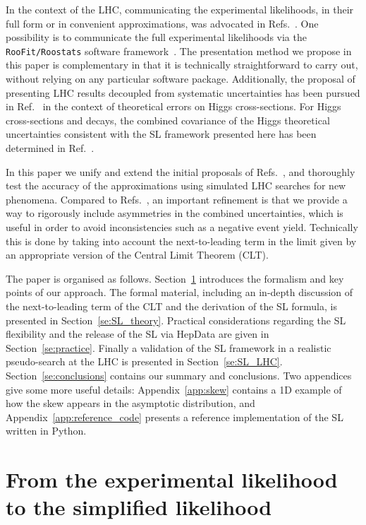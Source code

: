 \documentclass[11pt]{article}
\begin{document}
In the context of the LHC, communicating the experimental likelihoods, in their full form or in convenient approximations, was advocated in Refs.~\cite{Kraml:2012sg,Boudjema:2013qla}. 
One possibility is to communicate the full experimental likelihoods via the \texttt{RooFit/Roostats} software framework~\cite{Verkerke:2003ir,Moneta:2010pm}.  
The presentation method we propose in this paper is complementary in that it is technically straightforward to carry out, without relying on any
particular software package. Additionally, the proposal of presenting LHC results decoupled from systematic uncertainties has been pursued in Ref.~\cite{Cranmer:2013hia} in the context of theoretical errors on Higgs cross-sections. For Higgs cross-sections and decays, the combined covariance of the Higgs theoretical uncertainties consistent with the SL framework presented here has been determined in Ref.~\cite{Arbey:2016kqi}.

In this paper we unify and extend the initial proposals of Refs.~\cite{Fichet:2016gvx,SL_note}, and thoroughly test the accuracy of the approximations using simulated LHC searches for new phenomena.
Compared to Refs.~\cite{Fichet:2016gvx,SL_note}, an important  refinement is that we provide a way 
to rigorously include asymmetries in the combined uncertainties, which is useful in order to avoid inconsistencies such as a negative event yield. Technically this is done by taking into account the next-to-leading term in the limit given by an appropriate version of the Central Limit Theorem (CLT).

The paper is organised as follows. 
Section~\ref{se:EL_SL} introduces the formalism and key points of our approach.  
The formal material, including an in-depth discussion of the next-to-leading term of the CLT and the derivation of the SL formula, is presented in Section~\ref{se:SL_theory}. 
Practical considerations regarding the SL flexibility and the release of the SL via HepData are given in 
Section~\ref{se:practice}.
Finally a validation of the SL framework in a realistic pseudo-search at the LHC is presented in Section~\ref{se:SL_LHC}. 
Section~\ref{se:conclusions} contains our summary and conclusions.
Two appendices give some more useful details: 
Appendix~\ref{app:skew} contains a 1D example of how the skew appears in the asymptotic distribution, and 
Appendix~\ref{app:reference_code} presents a reference implementation of the SL written in Python. 


\clearpage
\section{From the experimental likelihood to the simplified likelihood}
\label{se:EL_SL}
\end{document}
